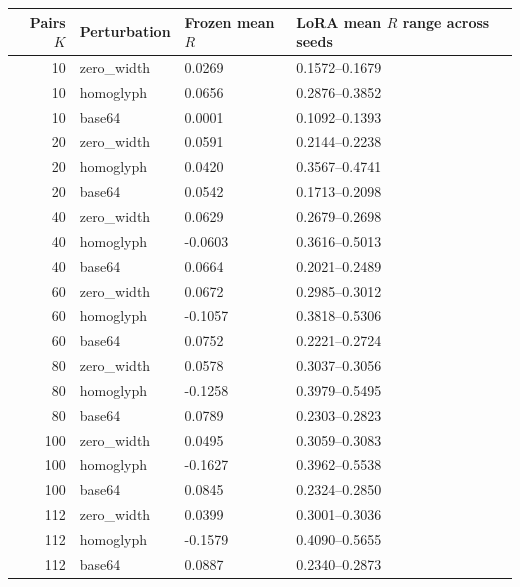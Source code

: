 \begin{tabular}{rlll}
\toprule
Pairs $K$ & Perturbation & Frozen mean $R$ & LoRA mean $R$ range across seeds\\\midrule
10 & zero\_width & 0.0269 & 0.1572--0.1679\\
10 & homoglyph & 0.0656 & 0.2876--0.3852\\
10 & base64 & 0.0001 & 0.1092--0.1393\\
20 & zero\_width & 0.0591 & 0.2144--0.2238\\
20 & homoglyph & 0.0420 & 0.3567--0.4741\\
20 & base64 & 0.0542 & 0.1713--0.2098\\
40 & zero\_width & 0.0629 & 0.2679--0.2698\\
40 & homoglyph & -0.0603 & 0.3616--0.5013\\
40 & base64 & 0.0664 & 0.2021--0.2489\\
60 & zero\_width & 0.0672 & 0.2985--0.3012\\
60 & homoglyph & -0.1057 & 0.3818--0.5306\\
60 & base64 & 0.0752 & 0.2221--0.2724\\
80 & zero\_width & 0.0578 & 0.3037--0.3056\\
80 & homoglyph & -0.1258 & 0.3979--0.5495\\
80 & base64 & 0.0789 & 0.2303--0.2823\\
100 & zero\_width & 0.0495 & 0.3059--0.3083\\
100 & homoglyph & -0.1627 & 0.3962--0.5538\\
100 & base64 & 0.0845 & 0.2324--0.2850\\
112 & zero\_width & 0.0399 & 0.3001--0.3036\\
112 & homoglyph & -0.1579 & 0.4090--0.5655\\
112 & base64 & 0.0887 & 0.2340--0.2873\\
\bottomrule\end{tabular}
